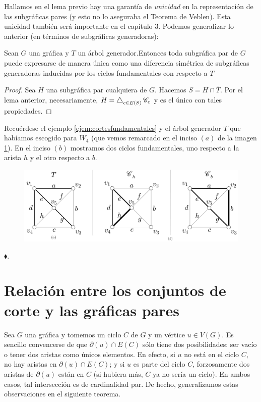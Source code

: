 Hallamos en el lema previo hay una garantía de \textit{unicidad} en la representación de las subgráficas pares (y esto no lo aseguraba el Teorema de Veblen). Esta unicidad también será importante en el capítulo 3. Podemos generalizar lo anterior (en términos de subgráficas generadoras): 

 \begin{teo} \label{cor:baseciclosfundamentales}
Sean $G$ una gráfica y $T$ un árbol generador.Entonces toda subgráfica par de $G$ puede expresarse de manera única como una diferencia simétrica de subgráficas generadoras inducidas por los ciclos fundamentales con respecto a $T$  
 \end{teo}
 
 \begin{proof}
 Sea $H$ una subgráfica par cualquiera de $G$. Hacemos $S= H \cap \overline{T}$. Por el lema anterior, necesariamente, $H = \difsym_{c \in E(S)} \mathscr{C}_{c}$ y es el único con tales propiedades. 
 
 \end{proof}
 
 
 \begin{ejem}
 Recuérdese el ejemplo \ref{ejem:cortesfundamentales} y el árbol generador $T$ que habíamos escogido para $W_{4}$ (que vemos remarcado en el inciso $(a)$ de la imagen \ref{fig:ciclosfundamentales}). En el inciso $(b)$ mostramos dos ciclos fundamentales, uno respecto a la arista $h$ y el otro respecto a $b$.
 
 \begin{figure}[H]
     \centering
     \includegraphics[scale=0.15]{img/imgchapter2/ciclosfundamentales.jpg}
     \caption{}
     \label{fig:ciclosfundamentales}
 \end{figure}
 
 \hfill $\blacklozenge$.
 \end{ejem}
 
 \section{Relación entre los conjuntos de corte y las gráficas pares}
 Sea $G$ una gráfica y tomemos un ciclo $C$ de $G$ y un vértice $u\in V(G)$. Es sencillo convencerse de que $\partial(u) \cap E(C)$ sólo tiene dos posibilidades: ser vacío o tener dos aristas como únicos elementos. En efecto, si $u$ no está en el ciclo $C$, no hay aristas en $\partial(u) \cap E(C)$; y si $u$ es parte del ciclo $C$, forzosamente dos aristas de $\partial(u)$ están en $C$ (si hubiera más, $C$ ya no sería un ciclo).  En ambos casos, tal intersección es de cardinalidad par. De hecho, generalizamos estas observaciones en el siguiente teorema.

